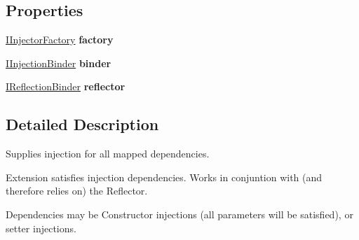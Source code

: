 \subsection*{Properties}
\begin{DoxyCompactItemize}
\item 
\hypertarget{classstrange_1_1extensions_1_1injector_1_1impl_1_1_injector_a3024581ccae080cd97ef911a10bb647c}{\hyperlink{interfacestrange_1_1extensions_1_1injector_1_1api_1_1_i_injector_factory}{I\-Injector\-Factory} {\bfseries factory}}\label{classstrange_1_1extensions_1_1injector_1_1impl_1_1_injector_a3024581ccae080cd97ef911a10bb647c}

\item 
\hypertarget{classstrange_1_1extensions_1_1injector_1_1impl_1_1_injector_ad39ca1235e74f3ca1b3a32ccc743029c}{\hyperlink{interfacestrange_1_1extensions_1_1injector_1_1api_1_1_i_injection_binder}{I\-Injection\-Binder} {\bfseries binder}}\label{classstrange_1_1extensions_1_1injector_1_1impl_1_1_injector_ad39ca1235e74f3ca1b3a32ccc743029c}

\item 
\hypertarget{classstrange_1_1extensions_1_1injector_1_1impl_1_1_injector_a6c22eb7e1a08cd5261882a0aa7ed7b38}{\hyperlink{interfacestrange_1_1extensions_1_1reflector_1_1api_1_1_i_reflection_binder}{I\-Reflection\-Binder} {\bfseries reflector}}\label{classstrange_1_1extensions_1_1injector_1_1impl_1_1_injector_a6c22eb7e1a08cd5261882a0aa7ed7b38}

\end{DoxyCompactItemize}


\subsection{Detailed Description}
Supplies injection for all mapped dependencies. 

Extension satisfies injection dependencies. Works in conjuntion with (and therefore relies on) the Reflector.

Dependencies may be Constructor injections (all parameters will be satisfied), or setter injections.

